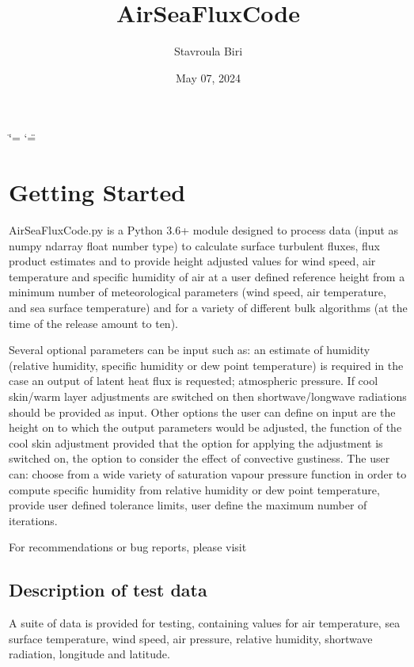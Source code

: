 \documentclass[letterpaper,10pt,english]{sphinxmanual}
\title{AirSeaFluxCode}
\date{May 07, 2024}
\author{Stavroula Biri}
\begin{document}
\ifdefined\shorthandoff
  \ifnum\catcode`\=\string=\active\shorthandoff{=}\fi
  \ifnum\catcode`\"=\active{}\fi
\fi

\pagestyle{empty}
\sphinxmaketitle
\pagestyle{plain}
\sphinxtableofcontents
\pagestyle{normal}
\label{\detokenize{index::doc}}


\sphinxstepscope


\chapter{Getting Started}
\label{\detokenize{getting_started:getting-started}}\label{\detokenize{getting_started::doc}}
\sphinxAtStartPar
AirSeaFluxCode.py is a Python 3.6+ module designed to process data (input as numpy ndarray float number type) to calculate surface turbulent fluxes, flux product estimates and to provide height adjusted values for wind speed, air temperature and specific humidity of air at a user defined reference height from a minimum number of meteorological parameters (wind speed, air temperature, and sea surface temperature) and for a variety of different bulk algorithms (at the time of the release amount to ten).

\sphinxAtStartPar
Several optional parameters can be input such as: an estimate of humidity (relative humidity, specific humidity or dew point temperature) is required in the case an output of latent heat flux is requested; atmospheric pressure. If cool skin/warm layer adjustments are switched on then shortwave/longwave radiations should be provided as input. Other options the user can define on input are the height on to which the output parameters would be adjusted, the function of the cool skin adjustment provided that the option for applying the adjustment is switched on, the option to consider the effect of convective gustiness. The user can: choose from a wide variety of saturation vapour pressure function in order to compute specific humidity from relative humidity or dew point temperature, provide user defined tolerance limits, user define the maximum number of iterations.

\sphinxAtStartPar
For recommendations or bug reports, please visit 


\section{Description of test data}
\label{\detokenize{getting_started:description-of-test-data}}
\sphinxAtStartPar
A suite of data is provided for testing, containing values for air temperature, sea surface temperature, wind speed, air pressure, relative humidity, shortwave radiation, longitude and latitude.
\end{document}
